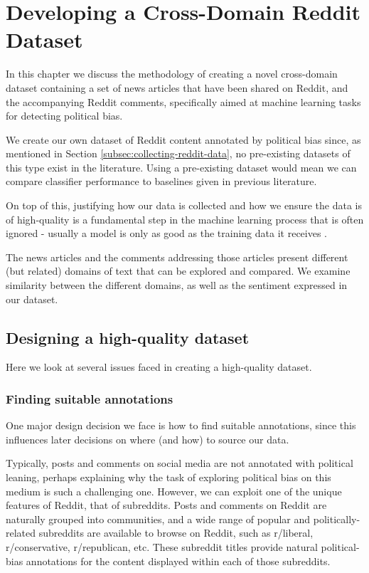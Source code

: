 \chapter{Developing a Cross-Domain Reddit Dataset} \label{chap:reddit-data}

In this chapter we discuss the methodology of creating a novel cross-domain dataset containing a set of news articles that have been shared on Reddit, and the accompanying Reddit comments, specifically aimed at machine learning tasks for detecting political bias.


We create our own dataset of Reddit content annotated by political bias since, as mentioned in Section \ref{subsec:collecting-reddit-data}, no pre-existing datasets of this type exist in the literature. Using a pre-existing dataset would mean we can compare classifier performance to baselines given in previous literature.

On top of this, justifying how our data is collected and how we ensure the data is of high-quality is a fundamental step in the machine learning process that is often ignored - usually a model is only as good as the training data it receives \cite{ilyas}.

The news articles and the comments addressing those articles present different (but related) domains of text that can be explored and compared. We examine similarity between the different domains, as well as the sentiment expressed in our dataset.

\section{Designing a high-quality dataset}

Here we look at several issues faced in creating a high-quality dataset.

\subsection{Finding suitable annotations} \label{subsec:annotations}

One major design decision we face is how to find suitable annotations, since this influences later decisions on where (and how) to source our data.

Typically, posts and comments on social media are not annotated with political leaning, perhaps explaining why the task of exploring political bias on this medium is such a challenging one. However, we can exploit one of the unique features of Reddit, that of subreddits. Posts and comments on Reddit are naturally grouped into communities, and a wide range of popular and politically-related subreddits are available to browse on Reddit, such as r/liberal, r/conservative, r/republican, etc. These subreddit titles provide natural political-bias annotations for the content displayed within each of those subreddits.

